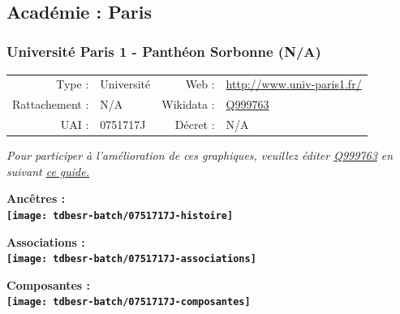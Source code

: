 \documentclass[12pt,french,]{article}
\begin{document}
\ifoddpage \fi ~\newpage  

\hypertarget{acaduxe9mie-paris}{%
\subsection{Académie : Paris}\label{acaduxe9mie-paris}}

\hypertarget{universituxe9-paris-1---panthuxe9on-sorbonne-na}{%
\subsubsection{Université Paris 1 - Panthéon Sorbonne
(N/A)}\label{universituxe9-paris-1---panthuxe9on-sorbonne-na}}

\begin{tabular*}{\textwidth}{rp{5cm}rl}  
\hline  
Type : & Université & Web : &\href{http://www.univ-paris1.fr/}{http://www.univ-paris1.fr/} \\  
Rattachement : & N/A & Wikidata : & \href{https://www.wikidata.org/entity/Q999763}{Q999763} \\  
UAI : & 0751717J & Décret : & N/A \\  
\hline  
\end{tabular*}

\textit{\scriptsize Pour participer à l'amélioration de ces graphiques, veuillez éditer  \href{https://www.wikidata.org/entity/Q999763}{Q999763}  en suivant \href{https://github.com/cpesr/wikidataESR/blob/master/Rmd/wikidataESR.md}{ce guide.}}

\vspace{1cm}  
\begin{minipage}[b]{0.50\textwidth}\begin{center} \bf Ancêtres : \\  
\texttt{[image: tdbesr-batch/0751717J-histoire]} \end{center}\end{minipage}\begin{minipage}[b]{0.50\textwidth}\begin{center} \bf Associations : \\  
\texttt{[image: tdbesr-batch/0751717J-associations]} \end{center}\end{minipage}

\hrulefill

\begin{center} \bf Composantes : \\  
\texttt{[image: tdbesr-batch/0751717J-composantes]} \end{center}
\end{document}
